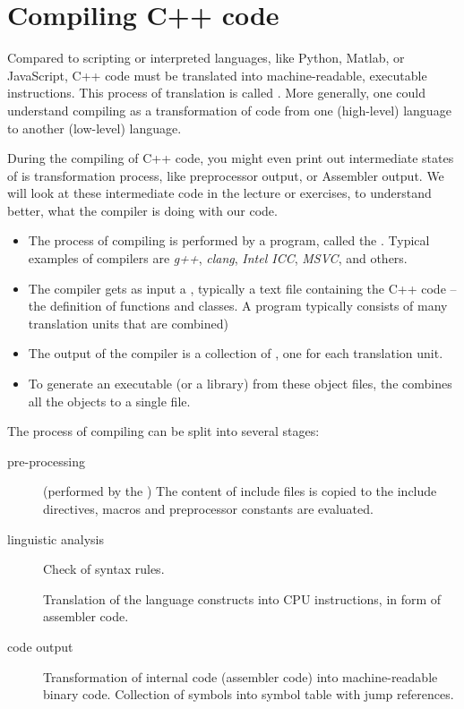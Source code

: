 \section{Compiling C++ code\label{sec:compiling}}
Compared to scripting or interpreted languages, like Python, Matlab, or JavaScript, C++ code must be translated into machine-readable, executable instructions. This process of translation is called . More generally, one could understand compiling as a transformation of code
from one (high-level) language to another (low-level) language.

\begin{rem}
  During the compiling of C++ code, you might even print out intermediate states of is transformation process, like preprocessor output, or
  Assembler output. We will look at these intermediate code in the lecture or exercises, to understand better, what the compiler is doing with
  our code.
\end{rem}

\begin{itemize}
\item The process of compiling is performed by a program, called the . Typical examples of compilers are \emph{g++},
      \emph{clang}, \emph{Intel ICC}, \emph{MSVC}, and others.
\item The compiler gets as input a , typically a text file containing the C++ code -- the definition of functions and classes.
      A program typically consists of many translation units that are combined)
\item The output of the compiler is a collection of , one for each translation unit.
\item To generate an executable (or a library) from these object files, the  combines all the objects to a single file.
\end{itemize}

The process of compiling can be split into several stages:
\begin{description}
  \item[pre-processing] (performed by the ) The content of include files is copied to the include directives, macros and
  preprocessor constants are evaluated.
  \item[linguistic analysis] Check of syntax rules.
  \item[] Translation of the language constructs into CPU instructions, \eg in form of assembler code.
  \item[code output] Transformation of internal code (assembler code) into machine-readable binary code. Collection of symbols into
  symbol table with jump references.
\end{description}

